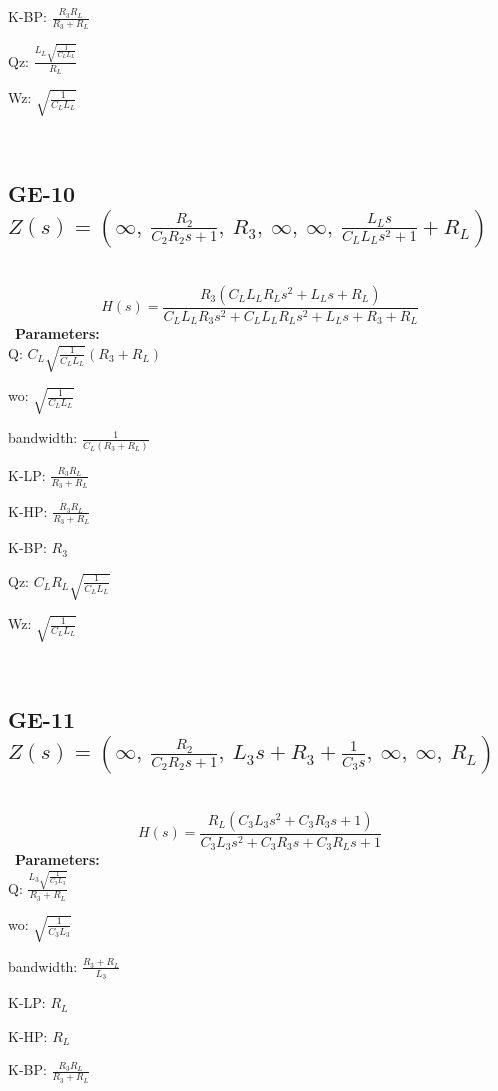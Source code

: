 \documentclass{article}
\begin{document}
K-BP: $\frac{R_{3} R_{L}}{R_{3} + R_{L}}$\ 

Qz: $\frac{L_{L} \sqrt{\frac{1}{C_{L} L_{L}}}}{R_{L}}$\ 

Wz: $\sqrt{\frac{1}{C_{L} L_{L}}}$\ 

\ 

\subsection{GE-10 $Z(s) = \left( \infty, \  \frac{R_{2}}{C_{2} R_{2} s + 1}, \  R_{3}, \  \infty, \  \infty, \  \frac{L_{L} s}{C_{L} L_{L} s^{2} + 1} + R_{L}\right)$ } \ 
\textbf{\[H(s) = \frac{R_{3} \left(C_{L} L_{L} R_{L} s^{2} + L_{L} s + R_{L}\right)}{C_{L} L_{L} R_{3} s^{2} + C_{L} L_{L} R_{L} s^{2} + L_{L} s + R_{3} + R_{L}}\] } \ 
\textbf{Parameters:}\\ 

Q: $C_{L} \sqrt{\frac{1}{C_{L} L_{L}}} \left(R_{3} + R_{L}\right)$\ 

wo: $\sqrt{\frac{1}{C_{L} L_{L}}}$\ 

bandwidth: $\frac{1}{C_{L} \left(R_{3} + R_{L}\right)}$\ 

K-LP: $\frac{R_{3} R_{L}}{R_{3} + R_{L}}$\ 

K-HP: $\frac{R_{3} R_{L}}{R_{3} + R_{L}}$\ 

K-BP: $R_{3}$\ 

Qz: $C_{L} R_{L} \sqrt{\frac{1}{C_{L} L_{L}}}$\ 

Wz: $\sqrt{\frac{1}{C_{L} L_{L}}}$\ 

\ 

\subsection{GE-11 $Z(s) = \left( \infty, \  \frac{R_{2}}{C_{2} R_{2} s + 1}, \  L_{3} s + R_{3} + \frac{1}{C_{3} s}, \  \infty, \  \infty, \  R_{L}\right)$ } \ 
\textbf{\[H(s) = \frac{R_{L} \left(C_{3} L_{3} s^{2} + C_{3} R_{3} s + 1\right)}{C_{3} L_{3} s^{2} + C_{3} R_{3} s + C_{3} R_{L} s + 1}\] } \ 
\textbf{Parameters:}\\ 

Q: $\frac{L_{3} \sqrt{\frac{1}{C_{3} L_{3}}}}{R_{3} + R_{L}}$\ 

wo: $\sqrt{\frac{1}{C_{3} L_{3}}}$\ 

bandwidth: $\frac{R_{3} + R_{L}}{L_{3}}$\ 

K-LP: $R_{L}$\ 

K-HP: $R_{L}$\ 

K-BP: $\frac{R_{3} R_{L}}{R_{3} + R_{L}}$\ 
\end{document}
